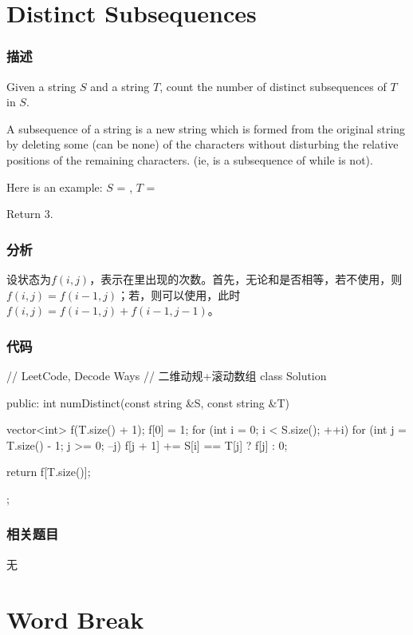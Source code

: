 \section{Distinct Subsequences} %
\label{sec:distinct-subsequences}


\subsubsection{描述}
Given a string $S$ and a string $T$, count the number of distinct subsequences of $T$ in $S$.

A subsequence of a string is a new string which is formed from the original string by deleting some (can be none) of the characters without disturbing the relative positions of the remaining characters. (ie,  is a subsequence of  while  is not).

Here is an example:
$S$ = , $T$ = 

Return 3.


\subsubsection{分析}
设状态为$f(i,j)$，表示在里出现的次数。首先，无论和是否相等，若不使用，则$f(i,j)=f(i-1,j)$；若，则可以使用，此时$f(i,j)=f(i-1,j)+f(i-1, j-1)$。


\subsubsection{代码}
\begin{Code}
// LeetCode, Decode Ways
// 二维动规+滚动数组
class Solution {
public:
    int numDistinct(const string &S, const string &T) {
        vector<int> f(T.size() + 1);
        f[0] = 1;
        for (int i = 0; i < S.size(); ++i) {
            for (int j = T.size() - 1; j >= 0; --j) {
                f[j + 1] += S[i] == T[j] ? f[j] : 0;
            }
        }

        return f[T.size()];
    }
};
\end{Code}


\subsubsection{相关题目}
\begindot
\item 无
\myenddot


\section{Word Break} %
\label{sec:word-break}


